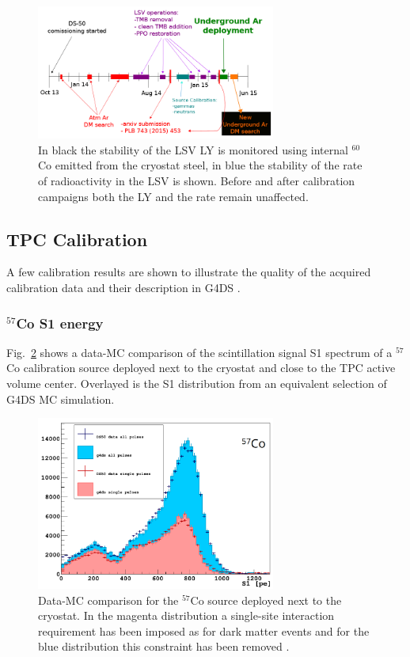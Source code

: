 \begin{figure}[htbp]
\centering
\includegraphics[width=0.7\textwidth]{./Figures/Yann_timeline.png}
\caption{In black the stability of the LSV LY is monitored using internal $^{60}$Co emitted from the cryostat steel, in blue the stability of the rate of radioactivity in the LSV is shown. Before and after calibration campaigns both the LY and the rate remain unaffected.
\label{fig:LSV:Stability}}
 \end{figure}


\subsection{TPC Calibration}
A few calibration results are shown to illustrate the quality of the acquired calibration data and their description in G4DS \cite{DS50:G4DS:paper}.

\subsubsection{$^{57}$Co S1 energy}
Fig.~\ref{fig:CalibData:Co57} shows a data-MC comparison of the scintillation signal S1 spectrum of a $^{57}$Co calibration source deployed next to the cryostat and close to the TPC active volume center. Overlayed is the S1 distribution from an equivalent selection of G4DS MC simulation.

\begin{figure}[htbp]
\centering
\includegraphics[width=0.7\textwidth]{./Figures/57Co_Paolo_G4DS_UCLA.png}
\caption{Data-MC comparison for the $^{57}$Co source deployed next to the cryostat. In the magenta distribution a single-site interaction requirement has been imposed as for dark matter events and for the blue distribution this constraint has been removed \cite{DS50:G4DS:paper}.
\label{fig:CalibData:Co57}}
 \end{figure}


